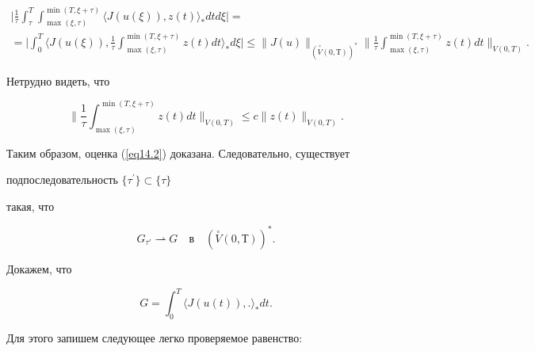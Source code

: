 \begin{pf}
\begin{multline*}
\bigg| \frac{1}{\tau} \int_{\tau}^{T}


 \int_{\max (\xi, \tau)}^{\min (T, \xi+\tau)}


\langle J(u(\xi)), z(t) \rangle_{*} dt d\xi \bigg|= \\


%


=\bigg| \int_{0}^{T} \langle J(u(\xi)), \frac{1}{\tau}


 \int_{\max (\xi,\tau)}^{\min (T,\xi+\tau)}


z(t) dt \rangle_{*} d \xi \bigg| \le


\| J(u) \|_{(\overset{\circ}{V}(0,Т))^{*}} 


\bigg\|\frac{1}{\tau} \int_{\max (\xi,\tau)}^{\min (T,\xi+\tau)}


z(t) dt \bigg\|_{V(0,T)}.


\end{multline*} 


Нетрудно видеть, что


$$


\bigg\| \frac{1}{\tau} \int_{\max (\xi, \tau)}^


{\min (T,\xi+\tau)}


z(t) dt \bigg\|_{V(0,T)} \le c \| z(t) \|_{V(0,T)}.


$$


Таким образом, оценка (\ref{eq14.2}) доказана. Следовательно, существует


подпоследовательность $\{ \tau^{\prime} \} \subset \{ \tau \}$


такая, что


\begin{equation}


G_{\tau '} \rightharpoonup G \quad \text{в}


\quad (\overset{\circ}{V}(0,Т))^{*}.


\label{eq14.3}


\end{equation}





Докажем, что


\begin{equation}


G=\int_{0}^{T} \langle J(u(t)),. \rangle_{*} dt.


\label{eq14.4}


\end{equation}


Для этого запишем следующее легко проверяемое равенство:



\end{pf}
